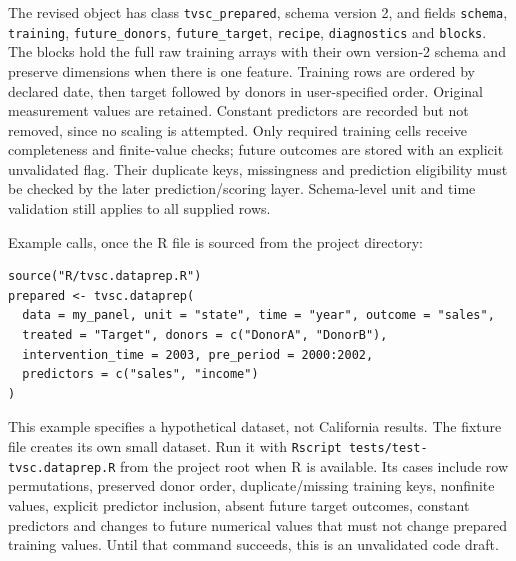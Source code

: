 \documentclass[11pt]{article}
\begin{document}
The revised object has class \texttt{tvsc\_prepared}, schema version 2,
and fields \texttt{schema}, \texttt{training}, \texttt{future\_donors},
\texttt{future\_target}, \texttt{recipe}, \texttt{diagnostics} and
\texttt{blocks}. The blocks hold the full raw training arrays with their
own version-2 schema and preserve dimensions when there is one feature.
Training rows are ordered by declared date, then target followed by donors
in user-specified order. Original measurement values are retained. Constant
predictors are recorded but not removed, since no scaling is attempted.
Only required training cells receive completeness and finite-value checks;
future outcomes are stored with an explicit unvalidated flag. Their
duplicate keys, missingness and prediction eligibility must be checked by
the later prediction/scoring layer. Schema-level unit and time validation
still applies to all supplied rows.

Example calls, once the R file is sourced from the project directory:
\begin{verbatim}
source("R/tvsc.dataprep.R")
prepared <- tvsc.dataprep(
  data = my_panel, unit = "state", time = "year", outcome = "sales",
  treated = "Target", donors = c("DonorA", "DonorB"),
  intervention_time = 2003, pre_period = 2000:2002,
  predictors = c("sales", "income")
)
\end{verbatim}
This example specifies a hypothetical dataset, not California results.
The fixture file creates its own small dataset. Run it with
\texttt{Rscript tests/test-tvsc.dataprep.R} from the project root when R is
available. Its cases include row permutations, preserved donor order,
duplicate/missing training keys, nonfinite values, explicit predictor
inclusion, absent future target outcomes, constant predictors and changes
to future numerical values that must not change prepared training values.
Until that command succeeds, this is an unvalidated code draft.
\end{document}
